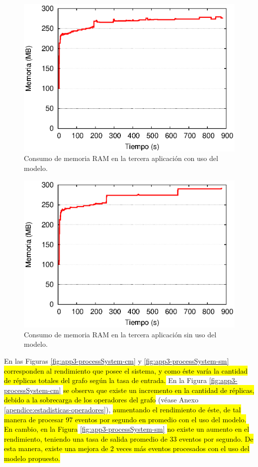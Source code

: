 \begin{figure}[!ht]
\centering
    \includegraphics[scale=0.75]{images/exp/app3/cm/fisical/consumeRAM.eps}
    \caption{Consumo de memoria RAM en la tercera aplicación con uso del modelo.}
    \label{fig:app3-consumeRAM-cm}
\end{figure}

\begin{figure}[!ht]
\centering
    \includegraphics[scale=0.75]{images/exp/app3/sm/fisical/consumeRAM.eps}
    \caption{Consumo de memoria RAM en la tercera aplicación sin uso del modelo.}
    \label{fig:app3-consumeRAM-sm}
\end{figure}


En las Figuras \ref{fig:app3-processSystem-cm} y \ref{fig:app3-processSystem-sm} \hl{corresponden al rendimiento que posee el sistema, y como éste varía la cantidad de réplicas totales del grafo según la tasa de entrada.} En la Figura \ref{fig:app3-processSystem-cm} \hl{se observa que existe un incremento en la cantidad de réplicas, debido a la sobrecarga de los operadores del grafo} (véase Anexo \ref{apendice:estadisticas-operadores}), \hl{aumentando el rendimiento de éste, de tal manera de procesar 97 eventos por segundo en promedio con el uso del modelo. En cambio, en la Figura} \ref{fig:app3-processSystem-sm} \hl{no existe un aumento en el rendimiento, teniendo una tasa de salida promedio de 33 eventos por segundo. De esta manera, existe una mejora de 2 veces más eventos procesados con el uso del modelo propuesto.}

